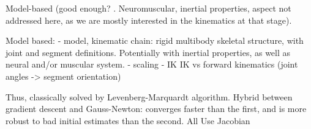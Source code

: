 













Model-based (good enough? \cite{Hicks2015}. Neuromuscular, inertial properties, aspect not addressed here, as we are mostly interested in the kinematics at that stage).

Model based:
- model, kinematic chain: rigid multibody skeletal structure, with joint and segment definitions. Potentially with inertial properties, as well as neural and/or muscular system.
- scaling
- IK
IK vs forward kinematics (joint angles -> segment orientation)





Thus, classically solved by Levenberg-Marquardt algorithm. Hybrid between gradient descent and Gauss-Newton: converges faster than the first, and is more robust to bad initial estimates than the second. All Use Jacobian


